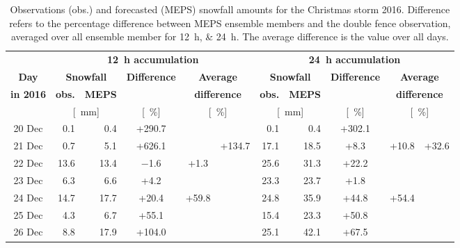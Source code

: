 \begin{table}[t]
	\begin{center}
		\caption{Observations (obs.) and forecasted (MEPS) snowfall amounts for the Christmas storm 2016. Difference refers to the percentage difference between MEPS ensemble members and the double fence observation, averaged over all ensemble member for \SIlist{12;24}{\hour}. The average difference is the value over all days.}\label{tab:res:MEPS_err}
		\begin{tabular}{c||r|r|c|c|c||r|r|c|c|c}
			\hline \hline
			& \multicolumn{5}{c||}{\textbf{\SI{12}{\hour} accumulation}} & \multicolumn{5}{c}{\textbf{\SI{24}{\hour} accumulation}}    \\ \cline{2-11}
			\textbf{Day} & \multicolumn{2}{c|}{\textbf{Snowfall}} & \textbf{Difference} & \multicolumn{2}{c||}{\textbf{Average}} &  \multicolumn{2}{c|}{\textbf{Snowfall}} & \textbf{Difference} & \multicolumn{2}{c}{\textbf{Average}}  \\\cline{2-3} \cline{7-8}
			\textbf{in 2016} & \textbf{obs.} & \textbf{MEPS} & & \multicolumn{2}{c||}{\textbf{difference}} & \textbf{obs.} & \textbf{MEPS} & & \multicolumn{2}{c}{\textbf{difference}} \\\cline{2-11}
			& \multicolumn{2}{c|}{[\SI{}{\mm}]} & [\SI{}{\percent}] & \multicolumn{2}{c||}{ [\SI{}{\percent}]} & \multicolumn{2}{c|}{[\SI{}{\mm}]} & [\SI{}{\percent}] & \multicolumn{2}{c}{ [\SI{}{\percent}]} \\ \hline\hline
			\num{20} Dec & \num{0.1} &\num{0.4} & +\num{290.7} & & &\num{0.1} & \num{0.4} & +\num{302.1} & & \\\cline{1-11}
			\num{21} Dec & \num{0.7} & \num{5.1} & +\num{626.1} &  &\multirow{6}{*}{+\num{134.7}} & \num{17.1} & \num{18.5} & +\num{8.3} & \multirow{3}{*}{+\num{10.8}}& \multirow{6}{*}{+\num{32.6}}   \\\cline{1-5}\cline{7-9} 
			\num{22} Dec & \num{13.6} & \num{13.4} & \num{-1.6} & \multirow{2}{*}{+\num{1.3}} & & \num{25.6} & \num{31.3} & +\num{22.2} &  &  \\\cline{1-4}\cline{7-9}
			\num{23} Dec & \num{6.3} & \num{6.6} & +\num{4.2} & & & \num{23.3} & \num{23.7} & +\num{1.8} &  &  \\\cline{1-5}\cline{7-10}
			\num{24} Dec & \num{14.7} & \num{17.7} & +\num{20.4} & \multirow{3}{*}{+\num{59.8}} & & \num{24.8} & \num{35.9} & +\num{44.8} & \multirow{3}{*}{+\num{54.4}}  &  \\\cline{1-4}\cline{7-9}
			\num{25} Dec & \num{4.3} & \num{6.7} & +\num{55.1} & & & \num{15.4} & \num{23.3} & +\num{50.8} & &   \\\cline{1-4}\cline{7-9}
			\num{26} Dec & \num{8.8} & \num{17.9} & +\num{104.0} & & & \num{25.1} & \num{42.1} & +\num{67.5} &  &  \\\hline\hline
		\end{tabular}
	\end{center}
\end{table}
